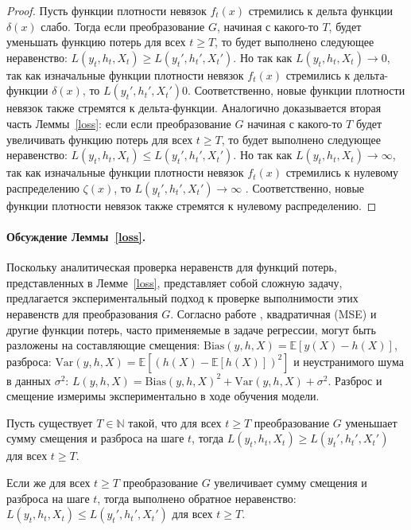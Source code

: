         \begin{proof}
            Пусть функции плотности невязок $f_t(x)$ стремились к дельта функции $\delta(x)$ слабо. Тогда если преобразование $G$, начиная с какого-то $T$, будет уменьшать функцию потерь для всех $t \geq T$, то будет выполнено следующее неравенство: 
            $L(y_t, h_t, X_t) \geq L(y_t', h_t', X_t')$. Но так как $L(y_t, h_t, X_t) \to 0$, так как изначальные функции плотности невязок $f_t(x)$ стремились к дельта-функции $\delta(x)$, то  $L(y_t', h_t', X_t') 0$. Соответственно, новые функции плотности невязок также стремятся к дельта-функции. Аналогично доказывается вторая часть Леммы~\ref{loss}: если если преобразование $G$ начиная с какого-то $T$ будет увеличивать функцию потерь для всех $t \geq T$, то будет выполнено следующее неравенство: $L(y_t, h_t, X_t) \leq L(y_t', h_t', X_t')$. Но так как $L(y_t, h_t, X_t) \to \infty$, так как изначальные функции плотности невязок $f_t(x)$ стремились к нулевому распределению $\zeta(x)$, то  $L(y_t', h_t', X_t') \to \infty$ . Соответственно, новые функции плотности невязок также стремятся к нулевому распределению.
        \end{proof}

        \paragraph{Обсуждение Леммы~\ref{loss}.} Поскольку аналитическая проверка неравенств для функций потерь, представленных в Лемме~\ref{loss}, представляет собой сложную задачу, предлагается экспериментальный подход к проверке выполнимости этих неравенств для преобразования $G$. Согласно работе \cite{domingos2000unified}, квадратичная (MSE) и другие функции потерь, часто применяемые в задаче регрессии, могут быть разложены на составляющие смещения: $\text{Bias}(y, h, X) = \mathbb{E}\left[ y(X) - h(X)\right]$, разброса: $\text{Var}(y, h, X) = \mathbb{E}\left[ \left(h(X) - \mathbb{E}\left[ h(X) \right] \right)^2\right]$ и неустранимого шума в данных $\sigma^2$:
        $L(y, h, X) = \text{Bias}(y, h, X)^2 + \text{Var}(y, h, X) + \sigma^2.$
        Разброс и смещение измеримы экспериментально в ходе обучения модели.

        \begin{lemma} \label{bvd}
            Пусть существует $T \in \mathbb{N}$ такой, что для всех $t \geq T$ преобразование $G$ уменьшает сумму смещения и разброса на шаге $t$, тогда $L(y_t, h_t, X_t) \geq L(y_t', h_t', X_t')$ для всех $t \geq T$.
            
	        Если же для всех $t \geq T$ преобразование $G$ увеличивает сумму смещения и разброса на шаге $t$, тогда выполнено обратное неравенство: $L(y_t, h_t, X_t) \leq L(y_t', h_t', X_t')$ для всех $t \geq T$.
        \end{lemma}

